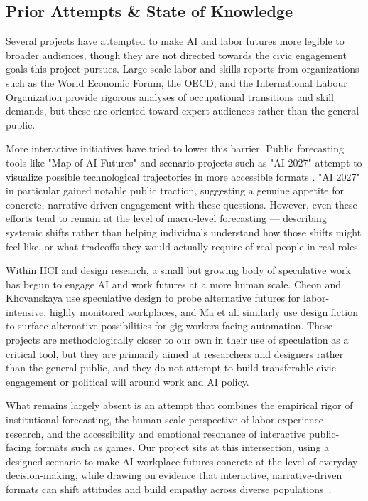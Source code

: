 \documentclass[sigconf,authordraft]{acmart}
\begin{document}
\subsection{Prior Attempts \& State of Knowledge}

Several projects have attempted to make AI and labor futures more legible to broader audiences, though they are not directed towards the civic engagement goals this project pursues. Large-scale labor and skills reports from organizations such as the World Economic Forum, the OECD, and the International Labour Organization provide rigorous analyses of occupational transitions and skill demands, but these are oriented toward expert audiences rather than the general public.

More interactive initiatives have tried to lower this barrier. Public forecasting tools like "Map of AI Futures" and scenario projects such as "AI 2027" attempt to visualize possible technological trajectories in more accessible formats \cite{ai2027}. "AI 2027" in particular gained notable public traction, suggesting a genuine appetite for concrete, narrative-driven engagement with these questions. However, even these efforts tend to remain at the level of macro-level forecasting — describing systemic shifts rather than helping individuals understand how those shifts might feel like, or what tradeoffs they would actually require of real people in real roles.

Within HCI and design research, a small but growing body of speculative work has begun to engage AI and work futures at a more human scale. Cheon and Khovanskaya \cite{cheon2024amazon} use speculative design to probe alternative futures for labor-intensive, highly monitored workplaces, and Ma et al. \cite{ma2025speculative} similarly use design fiction to surface alternative possibilities for gig workers facing automation. These projects are methodologically closer to our own in their use of speculation as a critical tool, but they are primarily aimed at researchers and designers rather than the general public, and they do not attempt to build transferable civic engagement or political will around work and AI policy.

What remains largely absent is an attempt that combines the empirical rigor of institutional forecasting, the human-scale perspective of labor experience research, and the accessibility and emotional resonance of interactive public-facing formats such as games. Our project sits at this intersection, using a designed scenario to make AI workplace futures concrete at the level of everyday decision-making, while drawing on evidence that interactive, narrative-driven formats can shift attitudes and build empathy across diverse populations~\cite{kolek2024video, cross2025path}.
\end{document}
